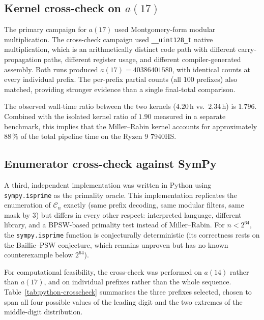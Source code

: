 \documentclass[11pt,a4paper]{article}
\theoremstyle{definition}
\begin{document}
\subsection{Kernel cross-check on \texorpdfstring{$a(17)$}{a(17)}}\label{sec:crosscheck}

The primary campaign for $a(17)$ used Montgomery-form modular
multiplication. The cross-check campaign used \texttt{\_\_uint128\_t}
native multiplication, which is an arithmetically distinct code path with
different carry-propagation paths, different register usage, and different
compiler-generated assembly. Both runs produced
$a(17) = \num{40386401580}$, with identical counts at every individual prefix. The per-prefix partial
counts (all $100$ prefixes) also matched, providing stronger evidence than
a single final-total comparison.

The observed wall-time ratio between the two kernels ($4.20\,\text{h}$
vs.\ $2.34\,\text{h}$) is $1.796$. Combined with the isolated kernel
ratio of $1.90$ measured in a separate benchmark, this implies that the
Miller--Rabin kernel accounts for approximately $88\,\%$ of the total
pipeline time on the Ryzen 9 7940HS.

\subsection{Enumerator cross-check against SymPy}\label{sec:sympy}

A third, independent implementation was written in Python using
\texttt{sympy.isprime} as the primality oracle. This implementation
replicates the enumeration of $\mathcal{C}_n$ exactly (same prefix
decoding, same modular filters, same mask by $3$) but differs in every
other respect: interpreted language, different library, and a BPSW-based
primality test instead of Miller--Rabin. For $n < 2^{64}$, the
\texttt{sympy.isprime} function is conjecturally deterministic (its
correctness rests on the Baillie--PSW conjecture, which remains unproven
but has no known counterexample below $2^{64}$).

For computational feasibility, the cross-check was performed on $a(14)$
rather than $a(17)$, and on individual prefixes rather than the whole
sequence. Table~\ref{tab:python-crosscheck} summarises the three prefixes
selected, chosen to span all four possible values of the leading digit and
the two extremes of the middle-digit distribution.
\end{document}
